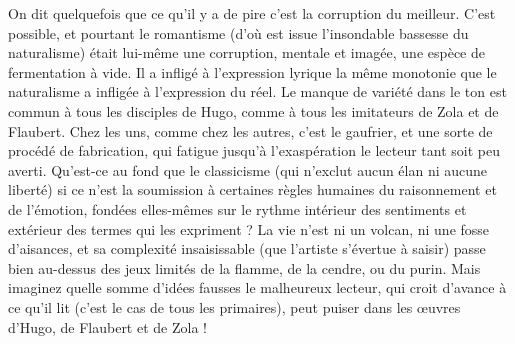 \documentclass[french,twoside]{book} %
\begin{document}
On dit quelquefois que ce qu’il y a de pire c’est la corruption du meilleur. C’est possible, et pourtant le romantisme (d’où est issue l’insondable bassesse du naturalisme) était lui-même une corruption, mentale et imagée, une espèce de fermentation à vide. Il a infligé à l’expression lyrique la même monotonie que le naturalisme a infligée à l’expression du réel. Le manque de variété dans le ton est commun à tous les disciples de Hugo, comme à tous les imitateurs de Zola et de Flaubert. Chez les uns, comme chez les autres, c’est le gaufrier, et une sorte de procédé de fabrication, qui fatigue jusqu’à l’exaspération le lecteur tant soit peu averti. Qu’est-ce au fond que le classicisme (qui n’exclut aucun élan ni aucune liberté) si ce n’est la soumission à certaines règles humaines du raisonnement et de l’émotion, fondées elles-mêmes sur le rythme intérieur des sentiments et extérieur des termes qui les expriment ? La vie n’est ni un volcan, ni une fosse d’aisances, et sa complexité insaisissable (que l’artiste s’évertue à saisir) passe bien au-dessus des jeux limités de la flamme, de la cendre, ou du purin. Mais imaginez quelle somme d’idées fausses le malheureux lecteur, qui croit d’avance à ce qu’il lit (c’est le cas de tous les primaires), peut puiser dans les œuvres d’Hugo, de Flaubert et de Zola !\par
\end{document}
